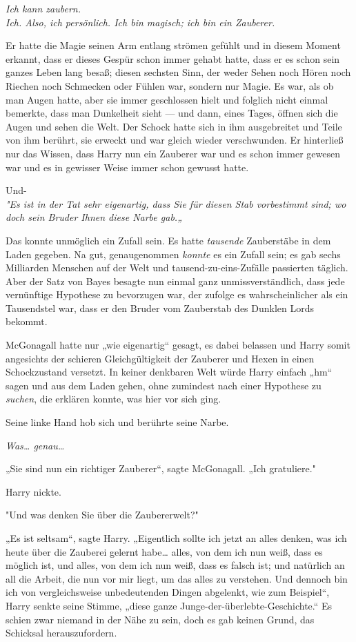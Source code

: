 {\emph{Ich kann zaubern.}\\ \emph{Ich. Also, ich persönlich. Ich bin magisch; ich bin ein Zauberer.}

Er hatte die Magie seinen Arm entlang strömen gefühlt und in diesem Moment erkannt, dass er dieses Gespür schon immer gehabt hatte, dass er es schon sein ganzes Leben lang besaß; diesen sechsten Sinn, der weder Sehen noch Hören noch Riechen noch Schmecken oder Fühlen war, sondern nur Magie. Es war, als ob man Augen hatte, aber sie immer geschlossen hielt und folglich nicht einmal bemerkte, dass man Dunkelheit sieht --- und dann, eines Tages, öffnen sich die Augen und sehen die Welt. Der Schock hatte sich in ihm ausgebreitet und Teile von ihm berührt, sie erweckt und war gleich wieder verschwunden. Er hinterließ nur das Wissen, dass Harry nun ein Zauberer war und es schon immer gewesen war und es in gewisser Weise immer schon gewusst hatte.

Und-\\ \emph{"Es ist in der Tat sehr eigenartig, dass Sie für diesen Stab vorbestimmt sind; wo doch sein Bruder Ihnen diese Narbe gab.„}

Das konnte unmöglich ein Zufall sein. Es hatte \emph{tausende} Zauberstäbe in dem Laden gegeben. Na gut, genaugenommen \emph{konnte} es ein Zufall sein; es gab sechs Milliarden Menschen auf der Welt und tausend-zu-eins-Zufälle passierten täglich. Aber der Satz von Bayes besagte nun einmal ganz unmissverständlich, dass jede vernünftige Hypothese zu bevorzugen war, der zufolge es wahrscheinlicher als ein Tausendstel war, dass er den Bruder vom Zauberstab des Dunklen Lords bekommt.

McGonagall hatte nur „wie eigenartig“ gesagt, es dabei belassen und Harry somit angesichts der schieren Gleichgültigkeit der Zauberer und Hexen in einen Schockzustand versetzt. In keiner denkbaren Welt würde Harry einfach „hm“ sagen und aus dem Laden gehen, ohne zumindest nach einer Hypothese zu \emph{suchen}, die erklären konnte, was hier vor sich ging.

Seine linke Hand hob sich und berührte seine Narbe.

\emph{Was… genau…}

„Sie sind nun ein richtiger Zauberer“, sagte McGonagall. „Ich gratuliere."

Harry nickte.

"Und was denken Sie über die Zaubererwelt?"

„Es ist seltsam“, sagte Harry. „Eigentlich sollte ich jetzt an alles denken, was ich heute über die Zauberei gelernt habe… alles, von dem ich nun weiß, dass es möglich ist, und alles, von dem ich nun weiß, dass es falsch ist; und natürlich an all die Arbeit, die nun vor mir liegt, um das alles zu verstehen. Und dennoch bin ich von vergleichsweise unbedeutenden Dingen abgelenkt, wie zum Beispiel“, Harry senkte seine Stimme, „diese ganze Junge-der-überlebte-Geschichte.“ Es schien zwar niemand in der Nähe zu sein, doch es gab keinen Grund, das Schicksal herauszufordern.

}
